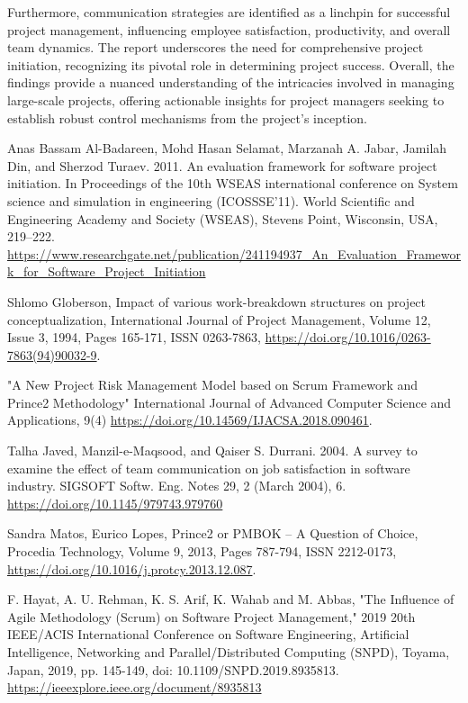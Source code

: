 \documentclass[runningheads]{llncs}
\begin{document}
Furthermore, communication strategies are identified as a linchpin for successful project management, influencing employee satisfaction, productivity, and overall team dynamics. The report underscores the need for comprehensive project initiation, recognizing its pivotal role in determining project success. Overall, the findings provide a nuanced understanding of the intricacies involved in managing large-scale projects, offering actionable insights for project managers seeking to establish robust control mechanisms from the project's inception.


\begin{thebibliography}{8}

Anas Bassam Al-Badareen, Mohd Hasan Selamat, Marzanah A. Jabar, Jamilah Din, and Sherzod Turaev. 2011. An evaluation framework for software project initiation. In Proceedings of the 10th WSEAS international conference on System science and simulation in engineering (ICOSSSE'11). World Scientific and Engineering Academy and Society (WSEAS), Stevens Point, Wisconsin, USA, 219–222.
\url{https://www.researchgate.net/publication/241194937_An_Evaluation_Framework_for_Software_Project_Initiation}

Shlomo Globerson,
Impact of various work-breakdown structures on project conceptualization,
International Journal of Project Management,
Volume 12, Issue 3,
1994,
Pages 165-171,
ISSN 0263-7863,
\url{https://doi.org/10.1016/0263-7863(94)90032-9}.

"A New Project Risk Management Model based on Scrum Framework and Prince2 Methodology" International Journal of Advanced Computer Science and Applications, 9(4) \url{https://doi.org/10.14569/IJACSA.2018.090461}.



Talha Javed, Manzil-e-Maqsood, and Qaiser S. Durrani. 2004. A survey to examine the effect of team communication on job satisfaction in software industry. SIGSOFT Softw. Eng. Notes 29, 2 (March 2004), 6. \url{https://doi.org/10.1145/979743.979760}

Sandra Matos, Eurico Lopes,
Prince2 or PMBOK – A Question of Choice,
Procedia Technology,
Volume 9,
2013,
Pages 787-794,
ISSN 2212-0173,
\url{https://doi.org/10.1016/j.protcy.2013.12.087}.

F. Hayat, A. U. Rehman, K. S. Arif, K. Wahab and M. Abbas, "The Influence of Agile Methodology (Scrum) on Software Project Management," 2019 20th IEEE/ACIS International Conference on Software Engineering, Artificial Intelligence, Networking and Parallel/Distributed Computing (SNPD), Toyama, Japan, 2019, pp. 145-149, doi: 10.1109/SNPD.2019.8935813.
\url{https://ieeexplore.ieee.org/document/8935813}


\end{thebibliography}
\end{document}
